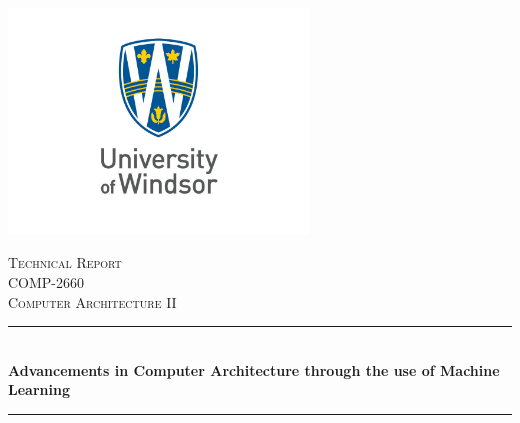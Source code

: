 \begin{titlepage}

    \newcommand{\HRule}{\rule{\linewidth}{0.5mm}} %
    
    \centering
    \includegraphics[width=8cm]{title/logo.jpg}\\[1cm] %
     
    
    \center %
    
    
    \textsc{\LARGE Technical Report}\\[1.5cm] 
    \textsc{\Large COMP-2660}\\[0.5cm] 
    \textsc{\large Computer Architecture II}\\[0.5cm] 
    
    \makeatletter
    \HRule \\[0.4cm]
    { \huge \bfseries Advancements in Computer Architecture through the use of Machine Learning}\\[0.4cm] %
    \HRule \\[1.5cm]
     

\end{titlepage}
